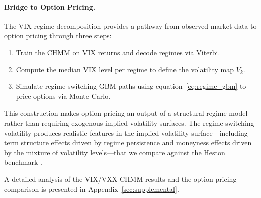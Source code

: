 \paragraph{Bridge to Option Pricing.}
The VIX regime decomposition provides a pathway from observed market data to option pricing through three steps:
\begin{enumerate}
    \item Train the CHMM on VIX returns and decode regimes via Viterbi.
    \item Compute the median VIX level per regime to define the volatility map $\bar{V}_k$.
    \item Simulate regime-switching GBM paths using equation~\eqref{eq:regime_gbm} to price options via Monte Carlo.
\end{enumerate}
This construction makes option pricing an output of a structural regime model rather than requiring exogenous implied volatility surfaces.
The regime-switching volatility produces realistic features in the implied volatility surface---including term structure effects driven by regime persistence and moneyness effects driven by the mixture of volatility levels---that we compare against the Heston benchmark \citep{heston1993closed}.

A detailed analysis of the VIX/VXX CHMM results and the option pricing comparison is presented in Appendix~\ref{sec:supplemental}.
